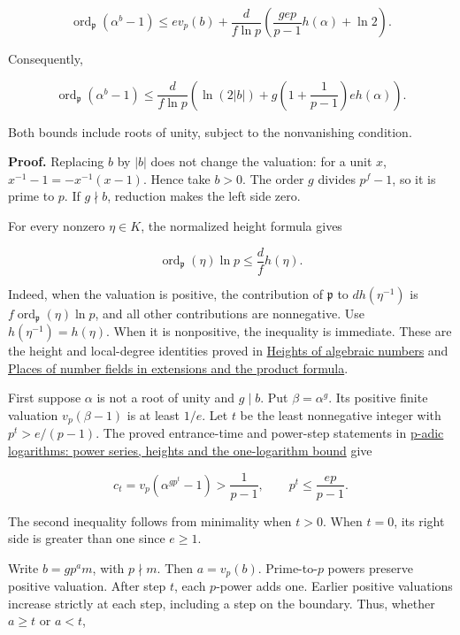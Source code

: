 \documentclass[
  11pt,
  a4paper,
]{article}
\begin{document}
\[
\operatorname{ord}_{\mathfrak p}(\alpha^b-1)
\le e v_p(b)+\frac d{f\ln p}
\left(\frac{gep}{p-1}h(\alpha)+\ln2\right).
\tag{10.59}
\]

Consequently,

\[
\operatorname{ord}_{\mathfrak p}(\alpha^b-1)
\le\frac d{f\ln p}
\left(\ln(2|b|)+g\left(1+\frac1{p-1}\right)e h(\alpha)\right).
\tag{10.60}
\]

Both bounds include roots of unity, subject to the nonvanishing
condition.

\textbf{Proof.} Replacing \(b\) by \(|b|\) does not change the
valuation: for a unit \(x\), \(x^{-1}-1=-x^{-1}(x-1)\). Hence take
\(b>0\). The order \(g\) divides \(p^f-1\), so it is prime to \(p\). If
\(g\nmid b\), reduction makes the left side zero.

For every nonzero \(\eta\in K\), the normalized height formula gives

\[
\operatorname{ord}_{\mathfrak p}(\eta)\ln p
\le\frac d f h(\eta).
\]

Indeed, when the valuation is positive, the contribution of
\(\mathfrak p\) to \(d h(\eta^{-1})\) is
\(f\operatorname{ord}_{\mathfrak p}(\eta)\ln p\), and all other
contributions are nonnegative. Use \(h(\eta^{-1})=h(\eta)\). When it is
nonpositive, the inequality is immediate. These are the height and
local-degree identities proved in
\href{../../TR-TRANS/TR-TRANS-02.html\#3-the-arithmetic-normalization-and-the-weil-height}{Heights
of algebraic numbers} and \href{../../NT-LOC/NT-LOC-05.html}{Places of
number fields in extensions and the product formula}.

First suppose \(\alpha\) is not a root of unity and \(g\mid b\). Put
\(\beta=\alpha^g\). Its positive finite valuation \(v_p(\beta-1)\) is at
least \(1/e\). Let \(t\) be the least nonnegative integer with
\(p^t>e/(p-1)\). The proved entrance-time and power-step statements in
\href{../TR-BAKER-09.html\#4-taking-powers-until-the-exponential-applies}{p-adic
logarithms: power series, heights and the one-logarithm bound} give

\[
c_t=v_p(\alpha^{gp^t}-1)>\frac1{p-1},
\qquad p^t\le\frac{ep}{p-1}.
\]

The second inequality follows from minimality when \(t>0\). When
\(t=0\), its right side is greater than one since \(e\ge1\).

Write \(b=g p^a m\), with \(p\nmid m\). Then \(a=v_p(b)\).
Prime-to-\(p\) powers preserve positive valuation. After step \(t\),
each \(p\)-power adds one. Earlier positive valuations increase strictly
at each step, including a step on the boundary. Thus, whether \(a\ge t\)
or \(a<t\),
\end{document}
